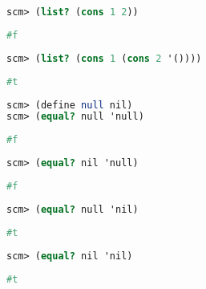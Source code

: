 \begin{lstlisting}[language=Scheme]
scm> (list? (cons 1 2))
\end{lstlisting}
\begin{solution}[0.15in]
\begin{lstlisting}[language=Scheme]
#f
\end{lstlisting}
\end{solution}

\begin{lstlisting}[language=Scheme]
scm> (list? (cons 1 (cons 2 '())))
\end{lstlisting}
\begin{solution}[0.25in]
\begin{lstlisting}[language=Scheme]
#t
\end{lstlisting}
\end{solution}

\begin{lstlisting}[language=Scheme]
scm> (define null nil)
scm> (equal? null 'null)
\end{lstlisting}
\begin{solution}[0.25in]
\begin{lstlisting}[language=Scheme]
#f
\end{lstlisting}
\end{solution}

\begin{lstlisting}[language=Scheme]
scm> (equal? nil 'null)
\end{lstlisting}
\begin{solution}[0.25in]
\begin{lstlisting}[language=Scheme]
#f
\end{lstlisting}
\end{solution}

\begin{lstlisting}[language=Scheme]
scm> (equal? null 'nil)
\end{lstlisting}
\begin{solution}[0.25in]
\begin{lstlisting}[language=Scheme]
#t
\end{lstlisting}
\end{solution}


\begin{lstlisting}[language=Scheme]
scm> (equal? nil 'nil)
\end{lstlisting}
\begin{solution}[0.25in]
\begin{lstlisting}[language=Scheme]
#t
\end{lstlisting}
\end{solution}


